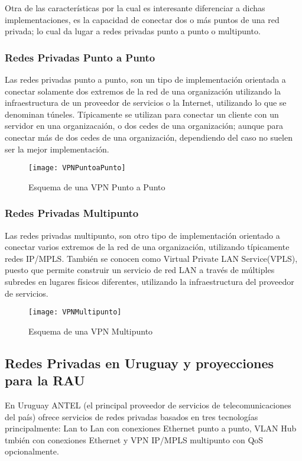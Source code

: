Otra de las características por la cual es interesante diferenciar a dichas implementaciones, es la capacidad de conectar dos o m\'as puntos de una red privada; lo cual da lugar a redes privadas punto a punto o multipunto.

\subsubsection{Redes Privadas Punto a Punto}

Las redes privadas punto a punto, son un tipo de implementaci\'on orientada a conectar solamente dos extremos de la red de una organizaci\'on utilizando la infraestructura de un proveedor de servicios o la Internet, utilizando lo que se denominan túneles. T\'ipicamente se utilizan para conectar un cliente con un servidor en una organizacai\'on, o dos cedes de una organizaci\'on; aunque para conectar m\'as de dos cedes de una organizaci\'on, dependiendo del caso no suelen ser la mejor implementaci\'on. 

\begin{figure}[htbp!] 
\centering    
\texttt{[image: VPNPuntoaPunto]}
\caption[Esquema de una VPN Punto a Punto]{Esquema de una VPN Punto a Punto}
\label{fig:OF10MatchingFields}
\end{figure}

\subsubsection{Redes Privadas Multipunto}

Las redes privadas multipunto, son otro tipo de implementaci\'on orientado a conectar varios extremos de la red de una organizaci\'on, utilizando t\'ipicamente redes IP/MPLS. Tambi\'en se conocen como Virtual Private LAN Service(VPLS), puesto que permite construir un servicio de red LAN a trav\'es de m\'ultiples subredes en lugares f\'isicos diferentes, utilizando la infraestructura del proveedor de servicios.

\begin{figure}[htbp!] 
\centering    
\texttt{[image: VPNMultipunto]}
\caption[Esquema de una VPN Multipunto]{Esquema de una VPN Multipunto}
\label{fig:OF10MatchingFields}
\end{figure}

\subsection{Redes Privadas en Uruguay y proyecciones para la RAU}
En Uruguay ANTEL (el principal proveedor de servicios de telecomunicaciones del país) ofrece servicios de redes privadas basados en tres tecnolog\'ias principalmente: Lan to Lan con conexiones Ethernet punto a punto, VLAN Hub tmbi\'en con conexiones Ethernet y VPN IP/MPLS multipunto con QoS opcionalmente.\\


